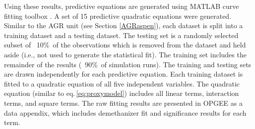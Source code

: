 \documentclass[11pt]{report}
\begin{document}
Using these results, predictive equations are generated using MATLAB curve fitting toolbox \cite{Mathworks2016}. A set of 15 predictive quadratic equations were generated. Similar to the AGR unit (see Section \ref{AGRaspen}), each dataset is split into a training dataset and a testing dataset. The testing set is a randomly selected subset of ~10\%\ of the observations which is removed from the dataset and held aside (i.e., not used to generate the statistical fit). The training set includes the remainder of the results (~90\%\ of simulation runs). The training and testing sets are drawn independently for each predictive equation. Each training dataset is fitted to a quadratic equation of all five independent variables. The quadratic equation (similar to eq.\,\eqref{eq:proxymodel}) includes all linear terms, interaction terms, and square terms. The raw fitting results are presented in OPGEE as a data appendix, which includes demethanizer fit and significance results for each term. 

\clearpage
\end{document}
